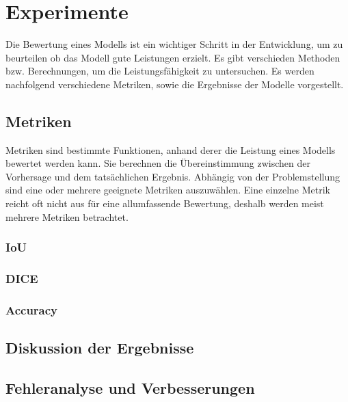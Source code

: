 \chapter{Experimente}
Die Bewertung eines \glspl{Modell} ist ein wichtiger Schritt in der Entwicklung, um zu beurteilen ob das \gls{Modell} gute Leistungen erzielt. Es gibt verschieden Methoden bzw. Berechnungen, um die Leistungsfähigkeit zu untersuchen. Es werden nachfolgend verschiedene Metriken, sowie die Ergebnisse der \gls{Modell}e vorgestellt.
\section{Metriken}
Metriken sind bestimmte Funktionen, anhand derer die Leistung eines \glspl{Modell} bewertet werden kann. Sie berechnen die Übereinstimmung zwischen der Vorhersage und dem tatsächlichen Ergebnis. Abhängig von der Problemstellung sind eine oder mehrere geeignete Metriken auszuwählen. Eine einzelne Metrik reicht oft nicht aus für eine allumfassende Bewertung, deshalb werden meist mehrere Metriken betrachtet.
\subsection{IoU}
\subsection{DICE}
\subsection{Accuracy}
\section{Diskussion der Ergebnisse}
\section{Fehleranalyse und Verbesserungen}
